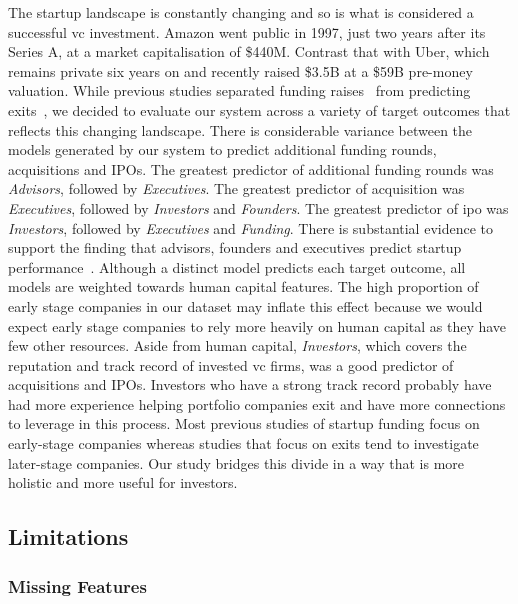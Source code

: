 \documentclass[../thesis/thesis.tex]{subfiles}
\begin{document}
The startup landscape is constantly changing and so is what is considered a successful \gls{vc} investment. Amazon went public in 1997, just two years after its Series A, at a market capitalisation of \$440M. Contrast that with Uber, which remains private six years on and recently raised \$3.5B at a \$59B pre-money valuation. While previous studies separated funding raises~\cite{beckwith2016,yuan2016,ahlers2015,an2015} from predicting exits~\cite{bhat2011}, we decided to evaluate our system across a variety of target outcomes that reflects this changing landscape. There is considerable variance between the models generated by our system to predict additional funding rounds, acquisitions and IPOs. The greatest predictor of additional funding rounds was \emph{Advisors}, followed by \emph{Executives}. The greatest predictor of acquisition was \emph{Executives}, followed by \emph{Investors} and \emph{Founders}. The greatest predictor of \gls{ipo} was \emph{Investors}, followed by \emph{Executives} and \emph{Funding}. There is substantial evidence to support the finding that advisors, founders and executives predict startup performance~\cite{baum2004,gimmon2010,beckwith2016}. Although a distinct model predicts each target outcome, all models are weighted towards human capital features. The high proportion of early stage companies in our dataset may inflate this effect because we would expect early stage companies to rely more heavily on human capital as they have few other resources. Aside from human capital, \emph{Investors}, which covers the reputation and track record of invested \gls{vc} firms, was a good predictor of acquisitions and IPOs. Investors who have a strong track record probably have had more experience helping portfolio companies exit and have more connections to leverage in this process. Most previous studies of startup funding focus on early-stage companies whereas studies that focus on exits tend to investigate later-stage companies. Our study bridges this divide in a way that is more holistic and more useful for investors.

\subsection{Limitations}

\subsubsection{Missing Features}
\end{document}
